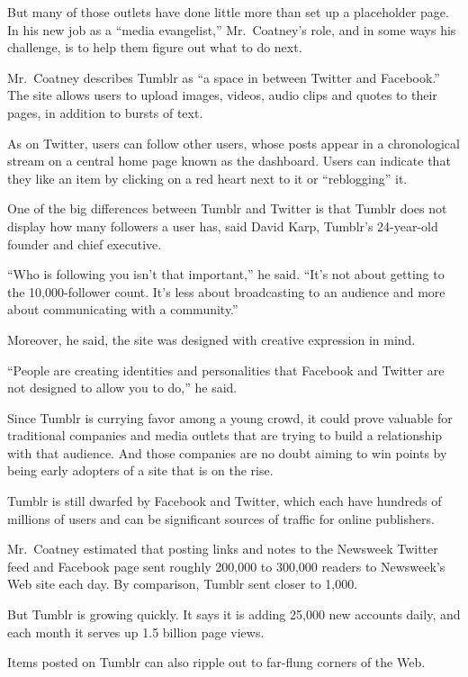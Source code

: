 ﻿\documentclass[12pt]{article}
\begin{document}
But many of those outlets have done little more than set up a placeholder page. In his new job as a
``media evangelist,'' Mr.~Coatney's role, and in some ways his challenge, is to help them figure out
what to do next.

Mr.~Coatney describes Tumblr as ``a space in between Twitter and Facebook.'' The site allows users
to upload images, videos, audio clips and quotes to their pages, in addition to bursts of text.

As on Twitter, users can follow other users, whose posts appear in a chronological stream on a
central home page known as the dashboard. Users can indicate that they like an item by clicking on a
red heart next to it or ``reblogging'' it.

One of the big differences between Tumblr and Twitter is that Tumblr does not display how many
followers a user has, said David Karp, Tumblr's 24-year-old founder and chief executive.

``Who is following you isn't that important,'' he said. ``It's not about getting to the
10,000-follower count. It's less about broadcasting to an audience and more about communicating with
a community.''

Moreover, he said, the site was designed with creative expression in mind.

``People are creating identities and personalities that Facebook and Twitter are not designed to
allow you to do,'' he said.

Since Tumblr is currying favor among a young crowd, it could prove valuable for traditional
companies and media outlets that are trying to build a relationship with that audience. And those
companies are no doubt aiming to win points by being early adopters of a site that is on the rise.

Tumblr is still dwarfed by Facebook and Twitter, which each have hundreds of millions of users and
can be significant sources of traffic for online publishers.

Mr.~Coatney estimated that posting links and notes to the Newsweek Twitter feed and Facebook page
sent roughly 200,000 to 300,000 readers to Newsweek's Web site each day. By comparison, Tumblr sent
closer to 1,000.

But Tumblr is growing quickly. It says it is adding 25,000 new accounts daily, and each month it
serves up 1.5 billion page views.

Items posted on Tumblr can also ripple out to far-flung corners of the Web.
\end{document}
